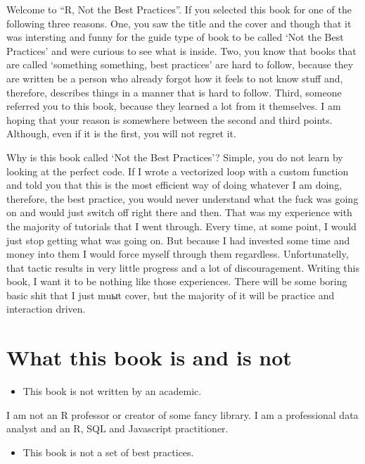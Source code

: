 \documentclass[]{book}
\providecommand{\tightlist}{%
  \setlength{\itemsep}{0pt}\setlength{\parskip}{0pt}}
\begin{document}
Welcome to ``R, Not the Best Practices''. If you selected this book for one of the following three reasons. One, you saw the title and the cover and though that it was intersting and funny for the guide type of book to be called `Not the Best Practices' and were curious to see what is inside. Two, you know that books that are called `something something, best practices' are hard to follow, because they are written be a person who already forgot how it feels to not know stuff and, therefore, describes things in a manner that is hard to follow. Third, someone referred you to this book, because they learned a lot from it themselves. I am hoping that your reason is somewhere between the second and third points. Although, even if it is the first, you will not regret it.

Why is this book called `Not the Best Practices'? Simple, you do not learn by looking at the perfect code. If I wrote a vectorized loop with a custom function and told you that this is the most efficient way of doing whatever I am doing, therefore, the best practice, you would never understand what the fuck was going on and would just switch off right there and then. That was my experience with the majority of tutorials that I went through. Every time, at some point, I would just stop getting what was going on. But because I had invested some time and money into them I would force myself through them regardless. Unfortunatelly, that tactic results in very little progress and a lot of discouragement. Writing this book, I want it to be nothing like those experiences. There will be some boring basic shit that I just muыt cover, but the majority of it will be practice and interaction driven.

\hypertarget{what-this-book-is-and-is-not}{%
\section{What this book is and is not}\label{what-this-book-is-and-is-not}}

\begin{itemize}
\tightlist
\item
  This book is not written by an academic.
\end{itemize}

I am not an R professor or creator of some fancy library. I am a professional data analyst and an R, SQL and Javascript practitioner.

\begin{itemize}
\tightlist
\item
  This book is not a set of best practices.
\end{itemize}
\end{document}

